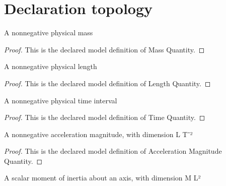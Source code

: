\section{Declaration topology}
\begin{definition}
  \label{def:physics:phyx-mini-0276:phyxminiproblems-problemphyxmini0276-massquantity}
  A nonnegative physical mass
\end{definition}
\begin{proof}
  This is the declared model definition of Mass Quantity.
\end{proof}
\begin{definition}
  \label{def:physics:phyx-mini-0276:phyxminiproblems-problemphyxmini0276-lengthquantity}
  A nonnegative physical length
\end{definition}
\begin{proof}
  This is the declared model definition of Length Quantity.
\end{proof}
\begin{definition}
  \label{def:physics:phyx-mini-0276:phyxminiproblems-problemphyxmini0276-timequantity}
  A nonnegative physical time interval
\end{definition}
\begin{proof}
  This is the declared model definition of Time Quantity.
\end{proof}
\begin{definition}
  \label{def:physics:phyx-mini-0276:phyxminiproblems-problemphyxmini0276-accelerationmagnitudequantity}
  A nonnegative acceleration magnitude, with dimension L T⁻²
\end{definition}
\begin{proof}
  This is the declared model definition of Acceleration Magnitude Quantity.
\end{proof}
\begin{definition}
  \label{def:physics:phyx-mini-0276:phyxminiproblems-problemphyxmini0276-momentofinertiaquantity}
  A scalar moment of inertia about an axis, with dimension M L²
\end{definition}
